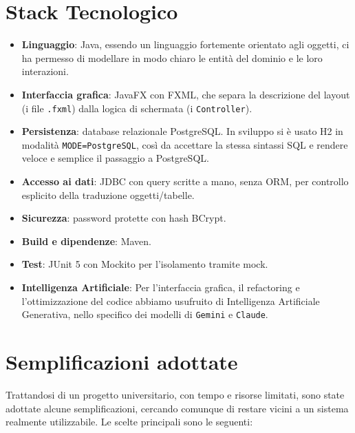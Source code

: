 \section{Stack Tecnologico}

\begin{itemize}
  \item \textbf{Linguaggio}: Java, essendo un linguaggio fortemente orientato agli oggetti, ci ha permesso di modellare in modo chiaro le entità del dominio e le loro interazioni.
  \item \textbf{Interfaccia grafica}: JavaFX con FXML, che separa la descrizione del layout (i file \texttt{.fxml}) dalla logica di schermata (i \texttt{Controller}).
  \item \textbf{Persistenza}: database relazionale PostgreSQL. In sviluppo si è
  usato H2 in modalità \texttt{MODE=PostgreSQL}, così da accettare la stessa
  sintassi SQL e rendere veloce e semplice il passaggio a PostgreSQL.
  \item \textbf{Accesso ai dati}: JDBC con query scritte a mano, senza ORM,
  per controllo esplicito della traduzione oggetti/tabelle.
  \item \textbf{Sicurezza}: password protette con hash BCrypt.
  \item \textbf{Build e dipendenze}: Maven.
  \item \textbf{Test}: JUnit 5 con Mockito per l'isolamento tramite mock.
  \item \textbf{Intelligenza Artificiale}: Per l'interfaccia grafica, il refactoring e l'ottimizzazione del codice abbiamo usufruito di Intelligenza Artificiale Generativa, nello specifico dei modelli di \texttt{Gemini} e \texttt{Claude}.
\end{itemize}

 

\section{Semplificazioni adottate}
\label{sec:semplificazioni}

Trattandosi di un progetto universitario, con tempo e risorse limitati, sono state adottate alcune semplificazioni, cercando comunque di restare vicini a un sistema realmente utilizzabile. Le scelte principali sono le seguenti:

